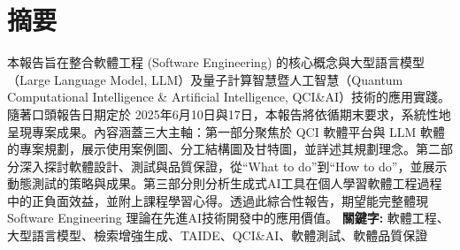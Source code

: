 \documentclass[twocolumn,11pt,a4paper]{article}
\begin{document}

\section*{摘要}
本報告旨在整合軟體工程 (Software Engineering) 的核心概念與大型語言模型（Large Language Model, LLM）及量子計算智慧暨人工智慧（Quantum Computational Intelligence \& Artificial Intelligence, QCI\&AI）技術的應用實踐。隨著口頭報告日期定於 2025年6月10日與17日，本報告將依循期末要求，系統性地呈現專案成果。內容涵蓋三大主軸：第一部分聚焦於 QCI 軟體平台與 LLM 軟體的專案規劃，展示使用案例圖、分工結構圖及甘特圖，並詳述其規劃理念。第二部分深入探討軟體設計、測試與品質保證，從“What to do”到“How to do”，並展示動態測試的策略與成果。第三部分則分析生成式AI工具在個人學習軟體工程過程中的正負面效益，並附上課程學習心得。透過此綜合性報告，期望能完整體現 Software Engineering 理論在先進AI技術開發中的應用價值。
\linebreak \linebreak 
\noindent \textbf{關鍵字:} 軟體工程、大型語言模型、檢索增強生成、TAIDE、QCI\&AI、軟體測試、軟體品質保證
\end{document}
